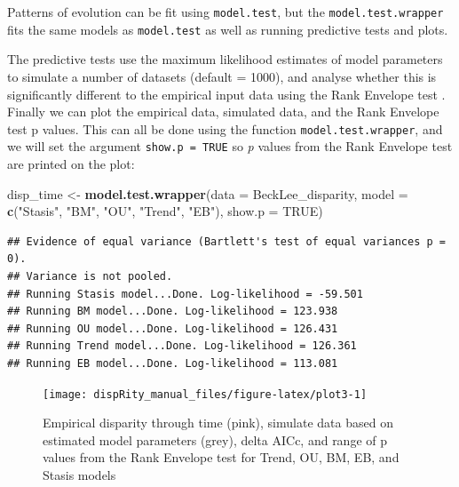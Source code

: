 \documentclass[]{book}
\newenvironment{Shaded}{\begin{snugshade}}{\end{snugshade}}
\newcommand{\KeywordTok}[1]{\textcolor[rgb]{0.13,0.29,0.53}{\textbf{#1}}}
\newcommand{\DataTypeTok}[1]{\textcolor[rgb]{0.13,0.29,0.53}{#1}}
\newcommand{\StringTok}[1]{\textcolor[rgb]{0.31,0.60,0.02}{#1}}
\newcommand{\OtherTok}[1]{\textcolor[rgb]{0.56,0.35,0.01}{#1}}
\newcommand{\NormalTok}[1]{#1}
\theoremstyle{definition}
\theoremstyle{definition}
\theoremstyle{definition}
\theoremstyle{remark}
\begin{document}
Patterns of evolution can be fit using \texttt{model.test}, but the
\texttt{model.test.wrapper} fits the same models as \texttt{model.test}
as well as running predictive tests and plots.

The predictive tests use the maximum likelihood estimates of model
parameters to simulate a number of datasets (default = 1000), and
analyse whether this is significantly different to the empirical input
data using the Rank Envelope test \citep{murrell2018global}. Finally we
can plot the empirical data, simulated data, and the Rank Envelope test
p values. This can all be done using the function
\texttt{model.test.wrapper}, and we will set the argument
\texttt{show.p\ =\ TRUE} so \emph{p} values from the Rank Envelope test
are printed on the plot:

\begin{Shaded}
\begin{Highlighting}[]
\NormalTok{disp_time <-}\StringTok{ }\KeywordTok{model.test.wrapper}\NormalTok{(}\DataTypeTok{data =}\NormalTok{ BeckLee_disparity, }\DataTypeTok{model =} \KeywordTok{c}\NormalTok{(}\StringTok{"Stasis"}\NormalTok{, }\StringTok{"BM"}\NormalTok{, }\StringTok{"OU"}\NormalTok{, }\StringTok{"Trend"}\NormalTok{, }\StringTok{"EB"}\NormalTok{),}
                                \DataTypeTok{show.p =} \OtherTok{TRUE}\NormalTok{)}
\end{Highlighting}
\end{Shaded}

\begin{verbatim}
## Evidence of equal variance (Bartlett's test of equal variances p = 0).
## Variance is not pooled.
## Running Stasis model...Done. Log-likelihood = -59.501
## Running BM model...Done. Log-likelihood = 123.938
## Running OU model...Done. Log-likelihood = 126.431
## Running Trend model...Done. Log-likelihood = 126.361
## Running EB model...Done. Log-likelihood = 113.081
\end{verbatim}

\begin{figure}

{\centering \texttt{[image: dispRity\_manual\_files/figure-latex/plot3-1]} 

}

\caption{Empirical disparity through time (pink), simulate data based on estimated model parameters (grey), delta AICc, and range of p values from the Rank Envelope test for Trend, OU, BM, EB, and Stasis models}\label{fig:plot3}
\end{figure}
\end{document}
